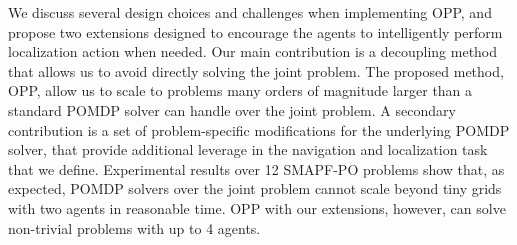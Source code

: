 \documentclass[letterpaper]{article} %
\begin{document}
We discuss several design choices and challenges when implementing OPP, and propose two extensions designed to encourage the agents to intelligently perform localization action when needed.
Our main contribution is a decoupling method that allows us to avoid directly solving the joint problem. The proposed method, OPP, allow us to scale to problems many orders of magnitude larger than a standard POMDP solver can handle over the joint problem. A secondary contribution is a set of problem-specific modifications for the underlying POMDP solver, that provide additional leverage in the navigation and localization task that we define.
Experimental results over 12 SMAPF-PO problems show that, as expected, POMDP solvers over the joint problem cannot scale beyond tiny grids with two agents in reasonable time. OPP with our extensions, however, can solve non-trivial problems with up to 4 agents.%
\end{document}
